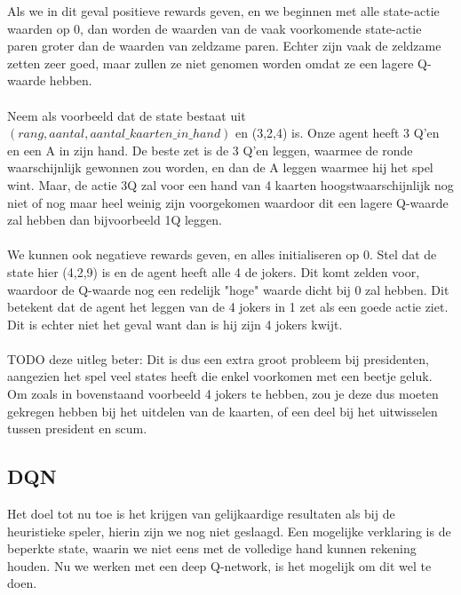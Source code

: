 \documentclass[11pt]{article}
\begin{document}
Als we in dit geval positieve rewards geven, en we beginnen met alle state-actie waarden op 0,  dan worden de waarden van de vaak voorkomende state-actie paren groter dan de waarden van zeldzame paren. Echter zijn vaak de zeldzame zetten zeer goed, maar zullen ze niet genomen worden omdat ze een lagere Q-waarde hebben. \\\\
Neem als voorbeeld dat de state bestaat uit $(rang, aantal, aantal\_kaarten\_in\_hand)$ en (3,2,4) is. Onze agent heeft 3 Q'en en een A in zijn hand. De beste zet is de 3 Q'en leggen, waarmee de ronde waarschijnlijk gewonnen zou worden, en dan de A leggen waarmee hij het spel wint. Maar, de actie 3Q zal voor een hand van 4 kaarten hoogstwaarschijnlijk nog niet of nog maar heel weinig zijn voorgekomen waardoor dit een lagere Q-waarde zal hebben dan bijvoorbeeld 1Q leggen.\\\\
We kunnen ook negatieve rewards geven, en alles initialiseren op 0. Stel dat de state hier (4,2,9) is en de agent heeft alle 4 de jokers. Dit komt zelden voor, waardoor de Q-waarde nog een redelijk "hoge" waarde dicht bij 0 zal hebben. Dit betekent dat de agent het leggen van de 4 jokers in 1 zet als een goede actie ziet. Dit is echter niet het geval want dan is hij zijn 4 jokers kwijt.\\\\
TODO deze uitleg beter: Dit is dus een extra groot probleem bij presidenten, aangezien het spel veel states heeft die enkel voorkomen met een beetje geluk. Om zoals in bovenstaand voorbeeld 4 jokers te hebben, zou je deze dus moeten gekregen hebben bij het uitdelen van de kaarten, of een deel bij het uitwisselen tussen president en scum.

\subsection{DQN}
Het doel tot nu toe is het krijgen van gelijkaardige resultaten als bij de heuristieke speler, hierin zijn we nog niet geslaagd. Een mogelijke verklaring is de beperkte state, waarin we niet eens met de volledige hand kunnen rekening houden. Nu we werken met een deep Q-network, is het mogelijk om dit wel te doen.
\end{document}
